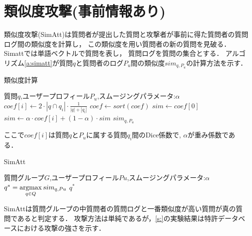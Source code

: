 \documentclass[master]{suribt}
\theoremstyle{definition}
\newcommand{\argmax}{\mathop{\rm argmax}\limits}
\begin{document}
 \section{類似度攻撃(事前情報あり)}
 類似度攻撃(SimAtt)\cite{simattack2016}は質問者が提出した質問と攻撃者が事前に得た質問者の質問ログ間の類似度を計算し，
 この類似度を用い質問者の新の質問を見破る．
 Simattでは単語ベクトルで質問を表し，
 質問ログを質問の集合とする．
 アルゴリズム\ref{a:simatt}が質問$q$と質問者のログ$P_u$間の類似度$sim_{q,P_u}$の計算方法を示す．

 \begin{algorithm}
 \caption{類似度計算}
 \begin{algorithmic}[1]
  \Require 質問$q$,ユーザープロフィール$P_u$,スムージングパラメータ:$\alpha$
  \State $coef[i] \leftarrow 2 \cdot |q \cap q_i| \cdot \frac{1}{|q|+|q_i|}$
  \EndFor
  \State $coef \gets sort(coef)$
  \State $sim \gets coef[0]$
  \State $sim \gets \alpha \cdot coef[i] + (1 - \alpha) \cdot sim$
  \EndFor
  \Ensure $sim_{q,P_u}$
 \end{algorithmic}
 \label{a:simatt}
 \end{algorithm}

 ここで$coef[i]$は質問$q$と$P_u$に属する質問$q_i$間のDice係数\cite{}で,
 $\alpha$が重み係数である．
  
 \begin{algorithm}
 \caption{SimAtt}
 \begin{algorithmic}[1]
   \Require 質問グループ$G$,ユーザープロフィール$Pu$,スムージングパラメータ:$\alpha$
   \State $q^* = \argmax_{q \in Q}sim_{q,Pu}$
   \Ensure $q^*$
 \end{algorithmic}
 \end{algorithm}

 SimAttは質問グループの中質問者の質問ログと一番類似度が高い質問が真の質問であると判定する．
 攻撃方法は単純であるが，\ref{s:}の実験結果は特許データベースにおける攻撃の強さを示す．
\end{document}
